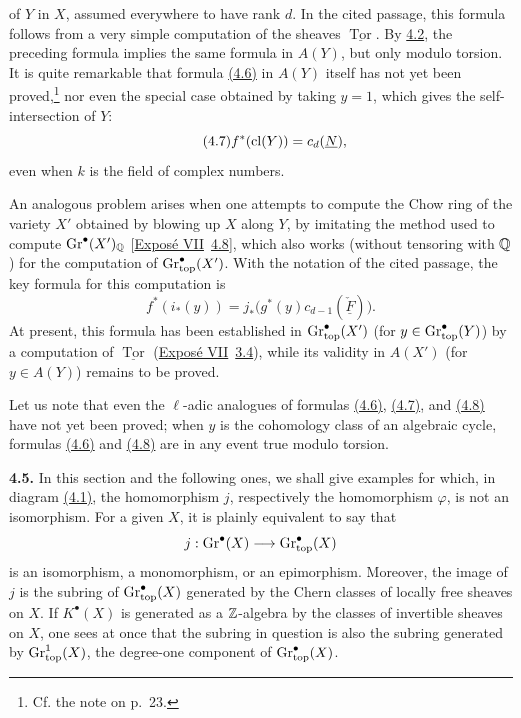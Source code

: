 of $Y$ in $X$, assumed everywhere to have rank $d$. In the cited passage,
this formula follows from a very simple computation of the sheaves
$\underline{\operatorname{Tor}}$. By \hyperlink{sga6.e14.para.4-2}{4.2}, the preceding formula implies the
same formula in $A(Y)$, but only modulo torsion. It is quite remarkable that
formula \hyperlink{sga6.e14.eq.4-6}{(4.6)} in $A(Y)$ itself has not yet been proved,\footnote{Cf. the note
on p.~23.} nor even the special case obtained by taking $y=1$, which gives
the self-intersection of $Y$:
\begin{equation*}\tag{4.7}
 f^*(\operatorname{cl}(Y))=c_d(\underline{N}),
\end{equation*}
even when $k$ is the field of complex numbers.

An analogous problem arises when one attempts to compute the Chow ring of
the variety $X'$ obtained by blowing up $X$ along $Y$, by imitating the
method used to compute $\operatorname{Gr}^\bullet(X')_{\mathbb Q}$
[\hyperlink{sga6.e07.expose}{Exposé VII}~\hyperlink{sga6.e07.thm.4-8}{4.8}], which also works (without tensoring with $\mathbb Q$) for the
computation of $\operatorname{Gr}_{\mathrm{top}}^\bullet(X')$. With the notation of the cited passage,
the key formula for this computation is
\begin{equation*}\tag{4.8}
 f^*(i_*(y))
   =j_*\bigl(g^*(y)c_{d-1}(\check{\underline{F}})\bigr).
\end{equation*}
At present, this formula has been established in $\operatorname{Gr}_{\mathrm{top}}^\bullet(X')$ (for
$y\in\operatorname{Gr}_{\mathrm{top}}^\bullet(Y)$) by a computation of
$\underline{\operatorname{Tor}}$ (\hyperlink{sga6.e07.expose}{Exposé VII}~\hyperlink{sga6.e07.prop.3-4}{3.4}), while its validity in
$A(X')$ (for $y\in A(Y)$) remains to be proved.

Let us note that even the $\ell$-adic analogues of formulas \hyperlink{sga6.e14.eq.4-6}{(4.6)}, \hyperlink{sga6.e14.eq.4-7}{(4.7)},
and \hyperlink{sga6.e14.eq.4-8}{(4.8)} have not yet been proved; when $y$ is the cohomology class of an
algebraic cycle, formulas \hyperlink{sga6.e14.eq.4-6}{(4.6)} and \hyperlink{sga6.e14.eq.4-8}{(4.8)} are in any event true modulo
torsion.

\noindent{}\textbf{4.5.}
In this section and the following ones, we shall give examples for which,
in diagram \hyperlink{sga6.e14.eq.4-1}{(4.1)}, the homomorphism $j$, respectively the homomorphism
$\varphi$, is not an isomorphism. For a given $X$, it is plainly equivalent
to say that
\[
 j:\operatorname{Gr}^\bullet(X)\longrightarrow\operatorname{Gr}_{\mathrm{top}}^\bullet(X)
\]
is an isomorphism, a monomorphism, or an epimorphism. Moreover, the image of
$j$ is the subring of $\operatorname{Gr}_{\mathrm{top}}^\bullet(X)$ generated by the Chern classes of
locally free sheaves on $X$. If $K^\bullet(X)$ is generated as a
$\mathbb Z$-algebra by the classes of invertible sheaves on $X$, one sees at once
that the subring in question is also the subring generated by
$\operatorname{Gr}_{\mathrm{top}}^1(X)$, the degree-one component of $\operatorname{Gr}_{\mathrm{top}}^\bullet(X)$.

